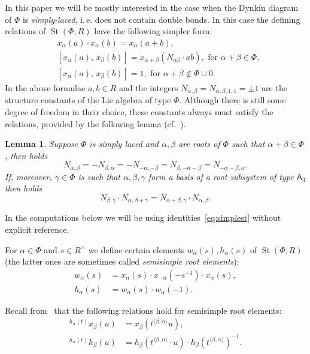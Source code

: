 \documentclass[oneside, 8pt]{amsart}
\newtheorem{lemma}{Lemma}
\theoremstyle{remark}
\theoremstyle{definition}
\DeclareMathOperator{\St}{St}
\newcommand{\rA}{\mathsf{A}}
\numberwithin{equation}{section}
\begin{document}
In this paper we will be mostly interested in the case when the Dynkin diagram of $\Phi$ is {\it simply-laced}, i.\,e. does not contain double bonds. In this case the defining relations of $\St(\Phi, R)$ have the following simpler form:
\begin{align}
&x_{\alpha}(a)\cdot x_{\alpha}(b)=x_{\alpha}(a+b), \tag{R1}\\
&[x_{\alpha}(a),\,x_{\beta}(b)]=x_{\alpha+\beta}(N_{\alpha\beta} \cdot ab),\text{ for }\alpha+\beta\in\Phi, \tag{R2} \\
&[x_{\alpha}(a),\,x_{\beta}(b)]=1,\text{ for }\alpha+\beta\not\in\Phi\cup0. \tag{R3}
\end{align}
In the above formulae $a, b \in R$ and the integers $N_{\alpha, \beta} = N_{\alpha, \beta, 1, 1} = \pm 1$ are the structure constants of the Lie algebra of type $\Phi$. Although there is still some degree of freedom in their choice, these constants always must satisfy the relations, provided by the following lemma (cf.~\cite[\S~14]{VP}).
\begin{lemma} Suppose $\Phi$ is simply laced and $\alpha, \beta$ are roots of $\Phi$ such that $\alpha+\beta\in \Phi$, then holds
\begin{equation} \label{eq:simplest} N_{\alpha, \beta} = -N_{\beta,\alpha} = - N_{-\alpha, -\beta} = N_{\beta, -\alpha-\beta} = N_{-\alpha-\beta, \alpha}. \end{equation}
If, moreover, $\gamma \in \Phi$ is such that $\alpha,\beta,\gamma$ form a basis of a root subsystem of type $\rA_3$ then holds
\begin{equation} \label{eq:cocycle} N_{\beta,\gamma} \cdot N_{\alpha, \beta+\gamma} = N_{\alpha+\beta, \gamma} \cdot N_{\alpha, \beta}. \end{equation} \end{lemma}
In the computations below we will be using identities~\eqref{eq:simplest} without explicit reference.

For $\alpha\in\Phi$ and $s \in R^\times$ we define certain elements $w_\alpha(s), h_\alpha(s)$ of $\St(\Phi, R)$ (the latter ones are sometimes called {\it semisimple root elements}):
\begin{align*} w_\alpha(s) & =  x_\alpha(s) \cdot x_{-\alpha}(-s^{-1}) \cdot x_\alpha(s), \\ h_\alpha(s) & =  w_\alpha(s) \cdot w_\alpha(-1).  \end{align*}

Recall from~\cite[Lemma~5.2]{Ma69} that the following relations hold for semisimple root elements:
\begin{align} \label{eq:conj-h-x} {}^{h_\alpha(t)}\!x_\beta(u) & = x_\beta(t^{\langle \beta,  \alpha \rangle}u), \\ \label{eq:conj-h-h} {}^{h_\alpha(t)}\!h_\beta(u) & = h_\beta(t^{\langle \beta, \alpha \rangle} \cdot u) \cdot h_\beta(t^{\langle \beta,  \alpha \rangle})^{-1}. \end{align}
\end{document}
